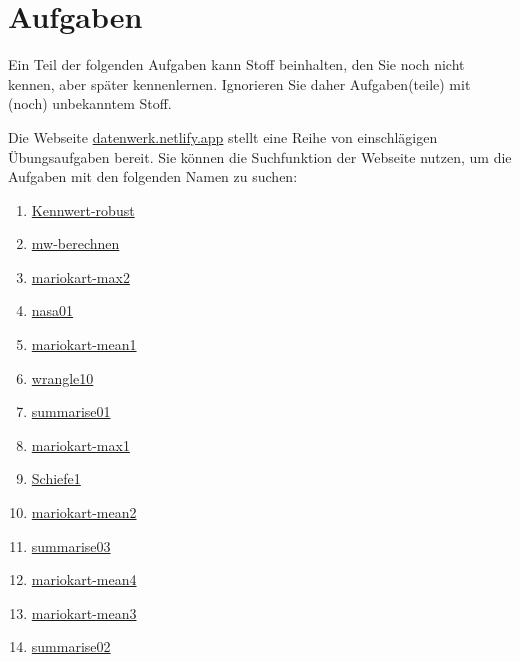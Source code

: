 \documentclass[
  letterpaper,
  twoside,
  open=any]{scrbook}
\providecommand{\tightlist}{%
  \setlength{\itemsep}{0pt}\setlength{\parskip}{0pt}}\usepackage{longtable,booktabs,array}
\theoremstyle{definition}
\theoremstyle{definition}
\theoremstyle{definition}
\theoremstyle{remark}
\begin{document}
\section{Aufgaben}\label{aufgaben-4}

Ein Teil der folgenden Aufgaben kann Stoff beinhalten, den Sie noch
nicht kennen, aber später kennenlernen. Ignorieren Sie daher
Aufgaben(teile) mit (noch) unbekanntem Stoff.

Die Webseite \href{https://datenwerk.netlify.app}{datenwerk.netlify.app}
stellt eine Reihe von einschlägigen Übungsaufgaben bereit. Sie können
die Suchfunktion der Webseite nutzen, um die Aufgaben mit den folgenden
Namen zu suchen:

\begin{enumerate}
\def\labelenumi{\arabic{enumi}.}
\tightlist
\item
  \href{https://sebastiansauer.github.io/Datenwerk/posts/kennwert-robust/kennwert-robust}{Kennwert-robust}
\item
  \href{https://sebastiansauer.github.io/Datenwerk/posts/mw-berechnen/mw-berechnen.html}{mw-berechnen}
\item
  \href{https://sebastiansauer.github.io/Datenwerk/posts/mariokart-max2/mariokart-max2.html}{mariokart-max2}
\item
  \href{https://sebastiansauer.github.io/Datenwerk/posts/nasa01/nasa01.html}{nasa01}
\item
  \href{https://sebastiansauer.github.io/Datenwerk/posts/mariokart-mean1/mariokart-mean1.html}{mariokart-mean1}
\item
  \href{https://sebastiansauer.github.io/Datenwerk/posts/wrangle10/wrangle10.html}{wrangle10}
\item
  \href{https://sebastiansauer.github.io/Datenwerk/posts/summarise01/summarise01.html}{summarise01}
\item
  \href{https://sebastiansauer.github.io/Datenwerk/posts/mariokart-max1/mariokart-max1.html}{mariokart-max1}
\item
  \href{https://sebastiansauer.github.io/Datenwerk/posts/schiefe1/schiefe1}{Schiefe1}
\item
  \href{https://sebastiansauer.github.io/Datenwerk/posts/mariokart-mean2/mariokart-mean2.html}{mariokart-mean2}
\item
  \href{https://sebastiansauer.github.io/Datenwerk/posts/summarise03/summarise03.html}{summarise03}
\item
  \href{https://sebastiansauer.github.io/Datenwerk/posts/mariokart-mean4/mariokart-mean4.html}{mariokart-mean4}
\item
  \href{https://sebastiansauer.github.io/Datenwerk/posts/mariokart-mean3/mariokart-mean3.html}{mariokart-mean3}
\item
  \href{https://sebastiansauer.github.io/Datenwerk/posts/summarise02/summarise02.html}{summarise02}
\end{enumerate}
\end{document}
